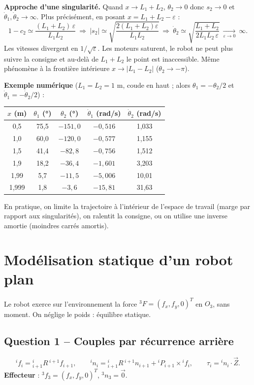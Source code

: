 \documentclass[11pt,a4paper]{article}
\newcommand{\dt}[1]{\dot\theta_{#1}}
\begin{document}
\textbf{Approche d'une singularité.} Quand $x\to L_1+L_2$, $\theta_2\to0$ donc $s_2\to0$ et $\dt1,\dt2\to\infty$. Plus précisément, en posant $x=L_1+L_2-\varepsilon$ :
\[1-c_2\simeq\frac{(L_1+L_2)\,\varepsilon}{L_1L_2}\ \Rightarrow\ |s_2|\simeq\sqrt{\frac{2(L_1+L_2)\varepsilon}{L_1L_2}}\ \Rightarrow\ \dt2\simeq\sqrt{\frac{L_1+L_2}{2L_1L_2\,\varepsilon}}\ \xrightarrow[\varepsilon\to0]{}\ \infty.\]
Les vitesses divergent en $1/\sqrt\varepsilon$. Les moteurs saturent, le robot ne peut plus suivre la consigne et au-delà de $L_1+L_2$ le point est inaccessible. Même phénomène à la frontière intérieure $x\to|L_1-L_2|$ ($\theta_2\to-\pi$).

\textbf{Exemple numérique} ($L_1=L_2=1$ m, coude en haut ; alors $\theta_1=-\theta_2/2$ et $\dt1=-\dt2/2$) :
\begin{center}\begin{tabular}{ccccc}\toprule
$x$ (m)&$\theta_1$ (°)&$\theta_2$ (°)&$\dt1$ (rad/s)&$\dt2$ (rad/s)\\\midrule
0,5 & 75,5 & $-151{,}0$ & $-0{,}516$ & 1,033\\
1,0 & 60,0 & $-120{,}0$ & $-0{,}577$ & 1,155\\
1,5 & 41,4 & $-82{,}8$ & $-0{,}756$ & 1,512\\
1,9 & 18,2 & $-36{,}4$ & $-1{,}601$ & 3,203\\
1,99 & 5,7 & $-11{,}5$ & $-5{,}006$ & 10,01\\
1,999 & 1,8 & $-3{,}6$ & $-15{,}81$ & 31,63\\\bottomrule
\end{tabular}\end{center}
En pratique, on limite la trajectoire à l'intérieur de l'espace de travail (marge par rapport aux singularités), on ralentit la consigne, ou on utilise une inverse amortie (moindres carrés amortis).

\section{Modélisation statique d'un robot plan}
Le robot exerce sur l'environnement la force ${}^3F=(f_x,f_y,0)^T$ en $O_3$, sans moment. On néglige le poids : équilibre statique.

\subsection*{Question 1 -- Couples par récurrence arrière}
\[{}^if_i={}^i_{i+1}R\,{}^{i+1}f_{i+1},\qquad {}^in_i={}^i_{i+1}R\,{}^{i+1}n_{i+1}+{}^iP_{i+1}\times{}^if_i,\qquad \tau_i={}^in_i\cdot\vec Z.\]
\textbf{Effecteur} : ${}^3f_3=(f_x,f_y,0)^T$, ${}^3n_3=\vec 0$.
\end{document}
